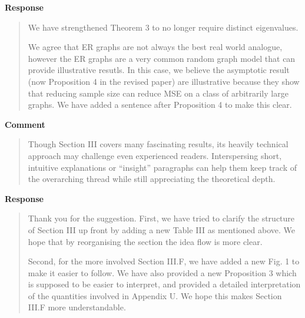 \documentclass[11pt,onecolumn,journal]{IEEEtran}
\theoremstyle{definition}
\begin{document}
\textbf{Response}
\begin{quote}
We have strengthened Theorem 3 to no longer require distinct eigenvalues. 

We agree that ER graphs are not always the best real world analogue, however the ER graphs are a very common random graph model that can provide illustrative resutls. In this case, we believe the asymptotic result (now Proposition 4 in the revised paper) are illustrative because they show that reducing sample size can reduce MSE on a class of arbitrarily large graphs. We have added a sentence after Proposition 4 to make this clear.

\iffalse
We do not intend that a practitioner carrying out signal reconstruction on a particular large graph sees our proposition and deduces that reducing sample size \emph{must} reduce MSE on their graph. Instead we hope that they see our proposition, note that the size of their graph and using optimal $\mu$ choice will not necessarily mean that reducing sample size will not reduce MSE, and thus they try to apply Theorem 3 to their specific graph.

We have added some text immediately above and below Proposition 4 in Section III-F (our asymptotic GLR result) to try and emphasise why this result on ER graphs is illustrative.
\fi
\end{quote}

\textbf{Comment}
\begin{quote}
Though Section III covers many fascinating results, its heavily technical approach may challenge even experienced readers. Interspersing short, intuitive explanations or “insight” paragraphs can help them keep track of the overarching thread while still appreciating the theoretical depth.
\end{quote}

\textbf{Response}
\begin{quote}
Thank you for the suggestion. First, we have tried to clarify the structure of Section III up front by adding a new Table III as mentioned above. We hope that by reorganising the section the idea flow is more clear. 

Second, for the more involved Section III.F, we have added a new Fig. 1 to make it easier to follow. We have also provided a new Proposition 3 which is supposed to be easier to interpret, and provided a detailed interpretation of the quantities involved in Appendix U. We hope this makes Section III.F more understandable. 

\end{quote}
\end{document}
